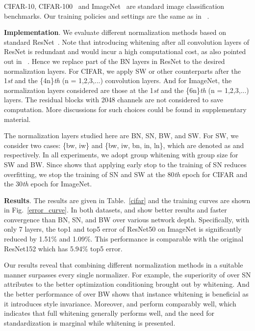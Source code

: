 \documentclass[10pt,twocolumn,letterpaper]{article}
\begin{document}
CIFAR-10, CIFAR-100~\cite{krizhevsky2009learning} and ImageNet~\cite{deng2009imagenet} are standard image classification benchmarks.
Our training policies and settings are the same as in ~\cite{he2016deep}.

\noindent\textbf{Implementation}.
We evaluate different normalization methods based on standard ResNet~\cite{he2016deep}.
Note that introducing whitening after all convolution layers of ResNet is redundant and would incur a high computational cost, as also pointed out in ~\cite{lei2018decorrelated}.
Hence we replace part of the BN layers in ResNet to the desired normalization layers.
For CIFAR, we apply SW or other counterparts after the 1\textit{st} and the \{4n\}\textit{th} (n = 1,2,3,...) convolution layers.
And for ImageNet, the normalization layers considered are those at the 1\textit{st} and the \{6n\}\textit{th} (n = 1,2,3,...) layers.
The residual blocks with 2048 channels are not considered to save computation.
More discussions for such choices could be found in supplementary material.

The normalization layers studied here are BN, SN, BW, and SW.
For SW, we consider two cases:  \{bw, iw\} and  \{bw, iw, bn, in, ln\}, which are denoted as  and  respectively.
In all experiments, we adopt group whitening with group size  for SW and BW.
Since \cite{luo2018normalization} shows that applying early stop to the training of SN reduces overfitting, we stop the training of SN and SW at the 80\textit{th} epoch for CIFAR and the 30\textit{th} epoch for ImageNet.

\noindent\textbf{Results}.
The results are given in Table.~\ref{cifar} and the training curves are shown in Fig.~\ref{error_curve}.
In both datasets,  and  show better results and faster convergence than BN, SN, and BW over various network depth.
Specifically, with only 7  layers, the top1 and top5 error of ResNet50 on ImageNet is significantly reduced by 1.51\% and 1.09\%.
This performance is comparable with the original ResNet152 which has 5.94\% top5 error.


Our results reveal that combining different normalization methods in a suitable manner surpasses every single normalizer.
For example, the superiority of  over SN attributes to the better optimization conditioning brought out by whitening.
And the better performance of  over BW shows that instance whitening is beneficial as it introduces style invariance.
Moreover,  and  perform comparably well, which indicates that full whitening generally performs well, and the need for standardization is marginal while whitening is presented.
\end{document}
